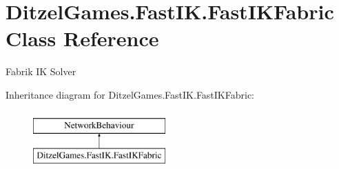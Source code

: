 \hypertarget{class_ditzel_games_1_1_fast_i_k_1_1_fast_i_k_fabric}{}\section{Ditzel\+Games.\+Fast\+I\+K.\+Fast\+I\+K\+Fabric Class Reference}
\label{class_ditzel_games_1_1_fast_i_k_1_1_fast_i_k_fabric}


Fabrik IK Solver  


Inheritance diagram for Ditzel\+Games.\+Fast\+I\+K.\+Fast\+I\+K\+Fabric\+:\begin{figure}[H]
\begin{center}
\leavevmode
\includegraphics[height=2.000000cm]{class_ditzel_games_1_1_fast_i_k_1_1_fast_i_k_fabric}
\end{center}
\end{figure}
